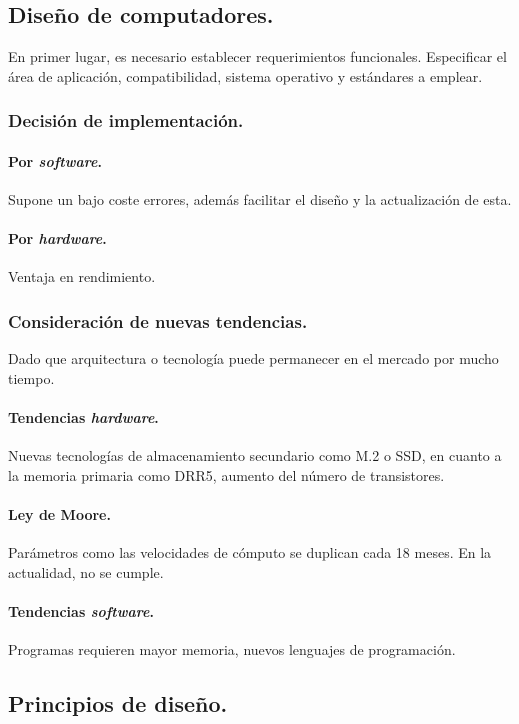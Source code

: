 \documentclass{article}
\begin{document}
\begin{multicols}{2}
		\subsection{Diseño de computadores.}
		En primer lugar, es necesario establecer requerimientos funcionales. Especificar el área de aplicación, compatibilidad, sistema operativo y estándares a emplear.
		
		\subsubsection{Decisión de implementación.}
		
		\paragraph{Por \textit{software}.} 
		Supone un bajo coste errores, además facilitar el diseño y la actualización de esta.
		\paragraph{Por \textit{hardware}.} 
		Ventaja en rendimiento.
		
		\subsubsection{Consideración de nuevas tendencias.}
		Dado que arquitectura o tecnología puede permanecer en el mercado por mucho tiempo.
		
		\paragraph{Tendencias \textit{hardware}.} Nuevas tecnologías de almacenamiento secundario como M.2 o SSD, en cuanto a la memoria primaria como DRR5, aumento del número de transistores.
		\paragraph{Ley de Moore.} Parámetros como las velocidades de cómputo se duplican cada 18 meses. En la actualidad, no se cumple.
		\paragraph{Tendencias \textit{software}.} Programas requieren mayor memoria, nuevos lenguajes de programación.
		
		\subsection{Principios de diseño.}
		

\end{multicols}
\end{document}
